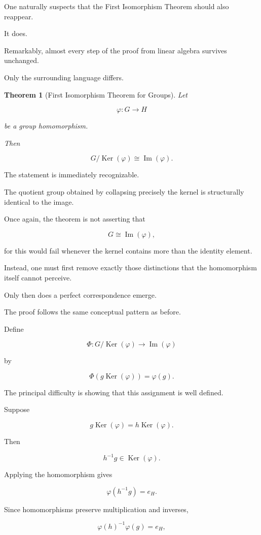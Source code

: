 \documentclass[11pt]{book}
\numberwithin{equation}{chapter}
\theoremstyle{definition}
\theoremstyle{plain}
\newtheorem{theorem}[definition]{Theorem}
\theoremstyle{remark}
\DeclareMathOperator{\Ker}{Ker}
\DeclareMathOperator{\Image}{Im}
\begin{document}
One naturally suspects that the First Isomorphism Theorem should also reappear.

It does.

Remarkably, almost every step of the proof from linear algebra survives unchanged.

Only the surrounding language differs.

\begin{theorem}[First Isomorphism Theorem for Groups]
Let

\[
\varphi:G\rightarrow H
\]

be a group homomorphism.

Then

\[
G/\Ker(\varphi)
\cong
\Image(\varphi).
\]

\end{theorem}

The statement is immediately recognizable.

The quotient group obtained by collapsing precisely the kernel is structurally identical to the image.

Once again, the theorem is not asserting that

\[
G\cong\Image(\varphi),
\]

for this would fail whenever the kernel contains more than the identity element.

Instead, one must first remove exactly those distinctions that the homomorphism itself cannot perceive.

Only then does a perfect correspondence emerge.

The proof follows the same conceptual pattern as before.

Define

\[
\Phi:G/\Ker(\varphi)\rightarrow\Image(\varphi)
\]

by

\[
\Phi(g\Ker(\varphi))
=
\varphi(g).
\]

The principal difficulty is showing that this assignment is well defined.

Suppose

\[
g\Ker(\varphi)
=
h\Ker(\varphi).
\]

Then

\[
h^{-1}g
\in
\Ker(\varphi).
\]

Applying the homomorphism gives

\[
\varphi(h^{-1}g)
=
e_H.
\]

Since homomorphisms preserve multiplication and inverses,

\[
\varphi(h)^{-1}\varphi(g)
=
e_H,
\]
\end{document}

